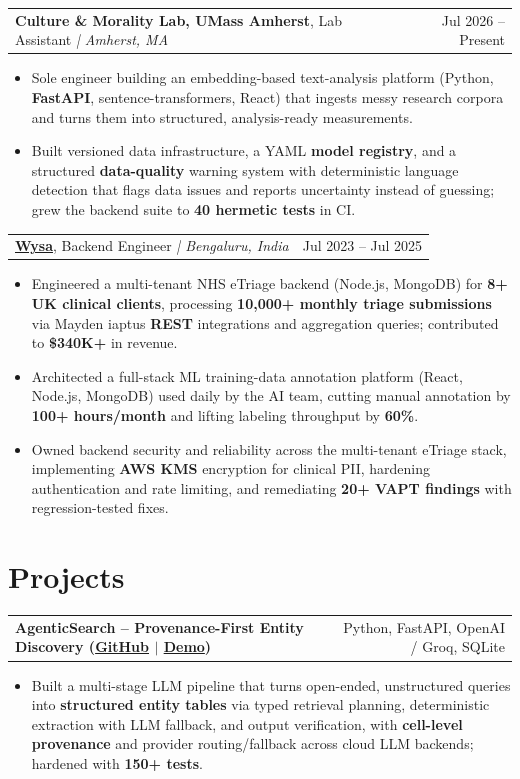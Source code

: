 \documentclass[letterpaper,11pt]{article}
\makeatletter
\newcommand{\expItem}[4]{%
  \vspace{2pt}
  \begin{tabular*}{\textwidth}{@{}l@{\extracolsep{\fill}}r@{}}
    \textbf{#1}, #2 \textit{| #3} & #4 \\
  \end{tabular*}\par\vspace{-3pt}
}
\newcommand{\projItem}[2]{%
  \vspace{2pt}
  \begin{tabular*}{\textwidth}{@{}l@{\extracolsep{\fill}}r@{}}
    \textbf{#1} & #2 \\
  \end{tabular*}\par\vspace{-3pt}
}
\makeatother
\begin{document}
\expItem{Culture \& Morality Lab, UMass Amherst}{Lab Assistant}{Amherst, MA}{Jul 2026 -- Present}
\begin{itemize}
  \item Sole engineer building an embedding-based text-analysis platform (Python, \textbf{FastAPI}, sentence-transformers, React) that ingests messy research corpora and turns them into structured, analysis-ready measurements.
  \item Built versioned data infrastructure, a YAML \textbf{model registry}, and a structured \textbf{data-quality} warning system with deterministic language detection that flags data issues and reports uncertainty instead of guessing; grew the backend suite to \textbf{40 hermetic tests} in CI.
\end{itemize}

\expItem{\href{https://www.wysa.io}{Wysa}}{Backend Engineer}{Bengaluru, India}{Jul 2023 -- Jul 2025}
\begin{itemize}
  \item Engineered a multi-tenant NHS eTriage backend (Node.js, MongoDB) for \textbf{8+ UK clinical clients}, processing \textbf{10{,}000+ monthly triage submissions} via Mayden iaptus \textbf{REST} integrations and aggregation queries; contributed to \textbf{\$340K+} in revenue.
  \item Architected a full-stack ML training-data annotation platform (React, Node.js, MongoDB) used daily by the AI team, cutting manual annotation by \textbf{100+ hours/month} and lifting labeling throughput by \textbf{60\%}.
  \item Owned backend security and reliability across the multi-tenant eTriage stack, implementing \textbf{AWS KMS} encryption for clinical PII, hardening authentication and rate limiting, and remediating \textbf{20+ VAPT findings} with regression-tested fixes.
\end{itemize}

\section{Projects}

\projItem{AgenticSearch -- Provenance-First Entity Discovery {\normalfont\small(\href{https://github.com/Deva-1903/ciir_agentic_search}{GitHub} $\vert$ \href{https://agentic-search-negglszkwa-uc.a.run.app}{Demo})}}{Python, FastAPI, OpenAI / Groq, SQLite}
\begin{itemize}
  \item Built a multi-stage LLM pipeline that turns open-ended, unstructured queries into \textbf{structured entity tables} via typed retrieval planning, deterministic extraction with LLM fallback, and output verification, with \textbf{cell-level provenance} and provider routing/fallback across cloud LLM backends; hardened with \textbf{150+ tests}.
\end{itemize}
\end{document}
